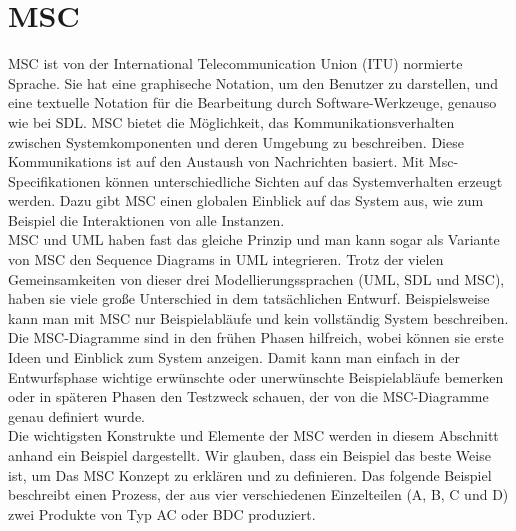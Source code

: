 
\section{MSC}
\label{sc:MSC}
MSC ist von der International Telecommunication Union (ITU) normierte Sprache.  Sie hat eine graphiseche Notation, um den Benutzer zu darstellen, und eine textuelle Notation für die Bearbeitung durch Software-Werkzeuge, genauso wie bei SDL\cite{MT009}.
MSC bietet die Möglichkeit, das Kommunikationsverhalten zwischen Systemkomponenten und deren Umgebung zu beschreiben. Diese Kommunikations ist auf den Austaush von Nachrichten basiert.
Mit Msc-Specifikationen können unterschiedliche Sichten auf das Systemverhalten erzeugt werden. 
Dazu gibt MSC einen globalen Einblick auf das System aus, wie zum Beispiel die Interaktionen von alle Instanzen.\\
MSC und UML haben fast das gleiche Prinzip und man kann sogar als Variante von MSC den Sequence Diagrams in UML integrieren.
Trotz der vielen Gemeinsamkeiten von dieser drei Modellierungssprachen (UML, SDL und MSC), haben sie viele große Unterschied in dem tatsächlichen Entwurf. Beispielsweise kann man mit MSC nur Beispielabläufe und kein vollständig System beschreiben.\\
Die MSC-Diagramme sind in den frühen Phasen hilfreich, wobei können sie erste Ideen und Einblick zum System anzeigen.
Damit kann man einfach in der Entwurfsphase wichtige erwünschte oder unerwünschte Beispielabläufe bemerken oder in späteren Phasen den Testzweck schauen, der von die MSC-Diagramme genau definiert wurde.\\

Die wichtigsten Konstrukte und Elemente der MSC werden in diesem Abschnitt anhand ein Beispiel dargestellt. Wir glauben, dass ein Beispiel das beste Weise ist, um Das MSC Konzept zu erklären und zu definieren. 
Das folgende Beispiel beschreibt einen Prozess, der aus vier verschiedenen Einzelteilen (A, B, C und D) zwei Produkte von Typ AC oder BDC produziert. 


